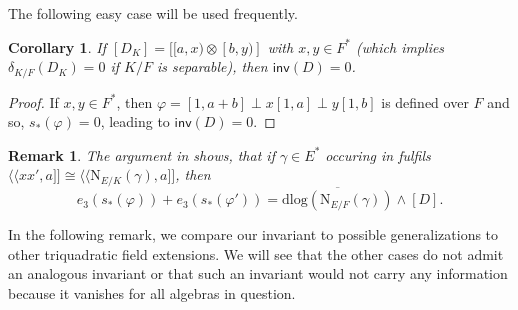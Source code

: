 \documentclass{amsart}
\newtheorem{corollary}[definition]{Corollary}
\newtheorem{remark}[definition]{Remark}
\numberwithin{equation}{section}
\newcommand{\qpf}[1]{\langle\!\langle #1]\!]}
\newcommand{\quat}[1]{[#1)}
\newcommand{\norm}{\mathrm{N}}
\newcommand{\dlog}{\mathrm{dlog}}
\newcommand{\inv}{\mathsf{inv}}
\begin{document}
The following easy case will be used frequently.

\begin{corollary} \label{cor_inv0ifDefOverF}
    If $[D_K] = [\quat{a, x} \otimes \quat{b, y}]$ with $x, y \in F^\ast$ (which implies $\delta_{K / F}(D_K) = 0$ if $K/F$ is separable), then $\inv(D) = 0$.
\end{corollary}
\begin{proof}
    If $x, y \in F^\ast$, then $\varphi = [1, a + b] \perp x[1, a] \perp y[1, b]$ is defined over $F$ and so, $s_\ast(\varphi) = 0$, leading to $\inv(D) = 0$.
\end{proof}

\begin{remark} \label{rem_EntriesOfBiquaternion}
	The argument in  shows, that if $\gamma \in E^\ast$ occuring in  fulfils $\qpf{xx', a} \cong \qpf{\norm_{E/K}(\gamma), a}$, then 
	\[e_3(s_\ast(\varphi)) + e_3(s_\ast(\varphi')) = \overline{\dlog(\norm_{E/F}(\gamma))} \wedge [D].\]
\end{remark}

In the following remark, we compare our invariant to possible generalizations to other triquadratic field extensions.
We will see that the other cases do not admit an analogous invariant or that such an invariant would not carry any information because it vanishes for all algebras in question.
\end{document}
